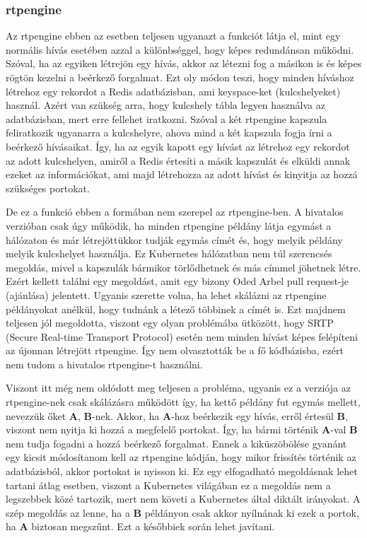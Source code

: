 \subsubsection{rtpengine}

Az rtpengine ebben az esetben teljesen ugyanazt a funkciót látja el, mint egy normális hívás
esetében azzal a különbséggel, hogy képes redundánsan működni. Szóval, ha az egyiken létrejön
egy hívás, akkor az létezni fog a másikon is és képes rögtön kezelni a beérkező forgalmat. Ezt
oly módon teszi, hogy minden híváshoz létrehoz egy rekordot a Redis adatbázisban, ami 
keyspace-ket (kulcshelyeket) használ. Azért van szükség arra, hogy kulcshely tábla legyen
használva az adatbázisban, mert erre fellehet iratkozni. Szóval a két rtpengine kapszula
feliratkozik ugyanarra a kulcshelyre, ahova mind a két kapszula fogja írni a beérkező hívásaikat.
Így, ha az egyik kapott egy hívást az létrehoz egy rekordot az adott kulcshelyen, amiről a 
Redis értesíti a másik kapszulát és elküldi annak ezeket az információkat, ami majd létrehozza
az adott hívást és kinyitja az hozzá szükséges portokat.  

De ez a funkció ebben a formában nem szerepel az rtpengine-ben. A hivatalos verzióban csak úgy 
működik, ha minden rtpengine példány látja egymást a hálózaton és már létrejöttükkor tudják
egymás címét és, hogy melyik példány melyik kulcshelyet használja. Ez Kubernetes hálózatban
nem túl szerencsés megoldás, mivel a kapszulák bármikor törlődhetnek és más címmel jöhetnek 
létre. Ezért kellett találni egy megoldást, amit egy bizony Oded Arbel pull request-je (ajánlása)
\cite{oded} jelentett. Ugyanis szerette volna, ha lehet skálázni az rtpengine példányokat anélkül, hogy 
tudnánk a létező többinek a címét is. Ezt majdnem teljesen jól megoldotta, viszont egy olyan 
problémába ütközött, hogy SRTP (Secure Real-time Transport Protocol) esetén nem minden hívást képes 
felépíteni az újonnan létrejött rtpengine. Így nem olvasztották be a fő kódbázisba, ezért nem tudom a 
hivatalos rtpengine-t használni.

Viszont itt még nem oldódott meg teljesen a probléma, ugyanis ez a verziója az rtpengine-nek csak
skálázásra működött így, ha kettő példány fut egymás mellett, nevezzük őket \textbf{A}, 
\textbf{B}-nek. Akkor, ha \textbf{A}-hoz beérkezik egy hívás, erről értesül \textbf{B}, viszont nem
nyitja ki hozzá a megfelelő portokat. Így, ha bármi történik \textbf{A}-val \textbf{B} nem tudja
fogadni a hozzá beérkező forgalmat. Ennek a kiküszöbölése gyanánt egy kicsit módosítanom 
kell az rtpengine kódján, hogy mikor frissítés történik az adatbázisból, akkor portokat is nyisson ki.
Ez egy elfogadható megoldásnak lehet tartani átlag esetben, viszont a Kubernetes világában
ez a megoldás nem a legszebbek közé tartozik, mert nem követi a Kubernetes által diktált
irányokat. A szép megoldás az lenne, ha a \textbf{B} példányon csak akkor nyílnának ki ezek a 
portok, ha \textbf{A} biztosan megszűnt. Ezt a későbbiek során lehet javítani. \\

